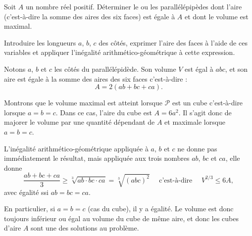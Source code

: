 \begin{exo}
Soit $A$ un nombre réel positif.
Déterminer le ou les  parallélépipèdes dont l'aire (c'est-à-dire la somme des aires des six faces) est égale à $A$ et dont le volume est maximal.

\begin{hint}
Introduire les longueurs $a$, $b$, $c$ des côtés, exprimer l'aire des faces à l'aide de ces variables et appliquer l'inégalité arithmético-géométrique à cette expression.
\end{hint}

\begin{sol}
Notons $a$, $b$ et $c$ les côtés du parallélépidède. Son volume $V$ est égal à $abc$, et son aire est égale à la somme des aires des six faces c'est-à-dire :
\[ A = 2(ab+bc+ca).\]

Montrons que le volume maximal est atteint lorsque $\mathcal P$ est un cube c'est-à-dire lorsque $a=b=c$. Dans ce cas, l'aire du cube est $A=6a^2$. Il s'agit donc de majorer le volume par une quantité dépendant de $A$ et maximale lorsque $a=b=c$.

L'inégalité arithmético-géométrique appliquée à $a$, $b$ et $c$ ne donne pas immédiatement le résultat, mais appliquée aux trois nombres $ab$, $bc$ et $ca$, elle  donne
 \[  \frac{ab+bc+ca}{3}  \geq \sqrt[3]{ab\cdot bc\cdot ca}=\sqrt[3]{(abc)^2}
 \quad \text{ c'est-à-dire } \quad 
V^{2/3} \leq 6A, \]
 avec égalité ssi $ab=bc=ca$.
 
En particulier, si $a=b=c$ (cas du cube), il y a égalité. Le volume est donc toujours inférieur ou égal au volume du cube de même aire, et donc les cubes d'aire $A$ sont une des solutions au problème.
\end{sol}
\end{exo}

